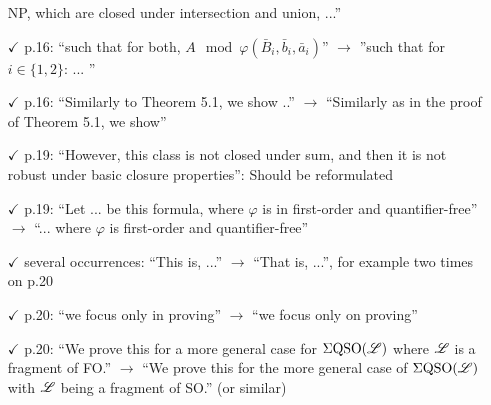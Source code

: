 \documentclass[a4paper]{article}
\begin{document}
\begin{itemize}
	NP, which are closed under intersection and union, ...''
	\item[$\checkmark$] p.16: ``such that for both, $A\mod\varphi(\bar{B}_i,\bar{b}_i,\bar{a}_i)$'' $\to$ ''such that for $i \in \{1,2\}$: ... ''
	\item[$\checkmark$] p.16: ``Similarly to Theorem 5.1, we show ..'' $\to$ ``Similarly as in the proof of Theorem 5.1, we
	show''
	\item[$\checkmark$] p.19: ``However, this class is not closed under sum, and then it is not robust under basic
	closure properties'': Should be reformulated
	\item[$\checkmark$] p.19: ``Let ... be this formula, where $\varphi$ is in first-order and quantifier-free'' $\to$ ``... where $\varphi$ is
	first-order and quantifier-free''
	\item[$\checkmark$] several occurrences: ``This is, ...'' $\to$ ``That is, ...'', for example two times on p.20
	\item[$\checkmark$] p.20: ``we focus only in proving'' $\to$ ``we focus only on proving''
	\item[$\checkmark$] p.20: ``We prove this for a more general case for $\Sigma{\rm QSO}(\mathscr{L})$ where $\mathscr{L}$ is a fragment of FO.''
	$\to$ ``We prove this for the more general case of $\Sigma{\rm QSO}(\mathscr{L})$ with $\mathscr{L}$ being a fragment of SO.''
	(or similar)
	

\end{itemize}
\end{document}
